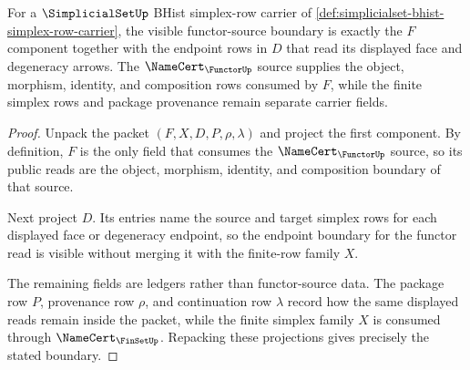 \begin{theorem}
\label{thm:simplicialset-functor-source-boundary}
For a $\SimplicialSetUp$ BHist simplex-row carrier of \autoref{def:simplicialset-bhist-simplex-row-carrier}, the visible functor-source boundary is exactly the $F$ component together with the endpoint rows in $D$ that read its displayed face and degeneracy arrows. The $\NameCert_{\FunctorUp}$ source supplies the object, morphism, identity, and composition rows consumed by $F$, while the finite simplex rows and package provenance remain separate carrier fields.
\end{theorem}
\begin{proof}
Unpack the packet $(F,X,D,P,\rho,\lambda)$ and project the first component. By definition, $F$ is the only field that consumes the $\NameCert_{\FunctorUp}$ source, so its public reads are the object, morphism, identity, and composition boundary of that source.

Next project $D$. Its entries name the source and target simplex rows for each displayed face or degeneracy endpoint, so the endpoint boundary for the functor read is visible without merging it with the finite-row family $X$.

The remaining fields are ledgers rather than functor-source data. The package row $P$, provenance row $\rho$, and continuation row $\lambda$ record how the same displayed reads remain inside the packet, while the finite simplex family $X$ is consumed through $\NameCert_{\FinSetUp}$. Repacking these projections gives precisely the stated boundary.
\end{proof}

